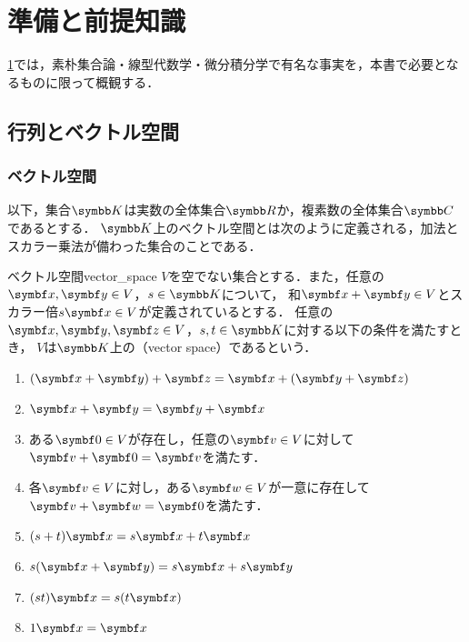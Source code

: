 \documentclass[../../main]{subfiles}
\begin{document}
\chapter{準備と前提知識}
\label{chapter:preliminary}

\begin{lead}
  \cref{chapter:preliminary}では，素朴集合論・線型代数学・微分積分学で有名な事実を，本書で必要となるものに限って概観する．
\end{lead}

\section{行列とベクトル空間}

\subsection{ベクトル空間}

以下，集合\(\numset{K}\)は実数の全体集合\(\numset{R}\)か，複素数の全体集合\(\numset{C}\)であるとする．
\(\numset{K}\)上のベクトル空間とは次のように定義される，加法とスカラー乗法が備わった集合のことである．

\begin{definition}{ベクトル空間}{vector_space}
  \(V\)を空でない集合とする．また，任意の\(\vect{x},\vect{y}\in V\)，\(s\in\numset{K}\)について，
  和\(\vect{x}+\vect{y}\in V\)とスカラー倍\(s\vect{x}\in V\)が定義されているとする．
  任意の\(\vect{x},\vect{y},\vect{z}\in V\)，\(s,t\in\numset{K}\)に対する以下の条件を満たすとき，
  \(V\)は\(\numset{K}\)上の（vector space）であるという．

  \begin{enumerate}
    \item \((\vect{x}+\vect{y})+\vect{z}=\vect{x}+(\vect{y}+\vect{z})\)
    \item \(\vect{x}+\vect{y}=\vect{y}+\vect{x}\)
    \item ある\(\zvec\in V\)が存在し，任意の\(\vect{v}\in V\)に対して\(\vect{v}+\zvec=\vect{v}\)を満たす．
    \item 各\(\vect{v}\in V\)に対し，ある\(\vect{w}\in V\)が一意に存在して\(\vect{v}+\vect{w}=\zvec\)を満たす．
    \item \((s+t)\vect{x}=s\vect{x}+t\vect{x}\)
    \item \(s(\vect{x}+\vect{y})=s\vect{x}+s\vect{y}\)
    \item \((st)\vect{x}=s(t\vect{x})\)
    \item \(1\vect{x}=\vect{x}\)
  \end{enumerate}
\end{definition}
\end{document}
